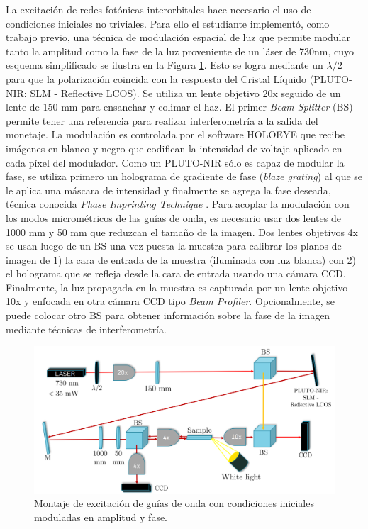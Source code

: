 \documentclass[12pt, letterpaper]{article}
\begin{document}
La excitación de redes fotónicas interorbitales hace necesario el uso de condiciones iniciales no triviales. Para ello el estudiante implementó, como trabajo previo, una técnica de modulación espacial de luz que permite modular tanto la amplitud como la fase de la luz proveniente de un láser de 730nm, cuyo esquema simplificado se ilustra en la Figura \ref{fig:SLM}. Esto se logra mediante un $\lambda/2$ para que la polarización coincida con la respuesta del Cristal Líquido (PLUTO-NIR: SLM - Reflective LCOS). Se utiliza un lente objetivo 20x seguido de un lente de 150 mm para ensanchar y colimar el haz. El primer \textit{Beam Splitter} (BS) permite tener una referencia para realizar interferometría a la salida del monetaje. La modulación es controlada por el software HOLOEYE que recibe imágenes en blanco y negro que codifican la intensidad de voltaje aplicado en cada píxel del modulador. Como un PLUTO-NIR sólo es capaz de modular la fase, se utiliza primero un holograma de gradiente de fase (\textit{blaze grating}) al que se le aplica una máscara de intensidad y finalmente se agrega la fase deseada, técnica conocida \textit{Phase Imprinting Technique} \cite{slm}. Para acoplar la modulación con los modos micrométricos de las guías de onda, es necesario usar dos lentes de 1000 mm y 50 mm que reduzcan el tamaño de la imagen. Dos lentes objetivos 4x se usan luego de un BS una vez puesta la muestra para calibrar los planos de imagen de 1) la cara de entrada de la muestra (iluminada con luz blanca) con 2) el holograma que se refleja desde la cara de entrada usando una cámara CCD. Finalmente, la luz propagada en la muestra es capturada por un lente objetivo 10x y enfocada en otra cámara CCD tipo \textit{Beam Profiler}. Opcionalmente, se puede colocar otro BS para obtener información sobre la fase de la imagen mediante técnicas de interferometría.

\begin{figure}[H]
	\centering
	\includegraphics[width=0.7\linewidth]{./media/SLMsetup.png}
	\caption{Montaje de excitación de guías de onda con condiciones iniciales moduladas en amplitud y fase.\label{fig:SLM}}
\end{figure}
\end{document}
